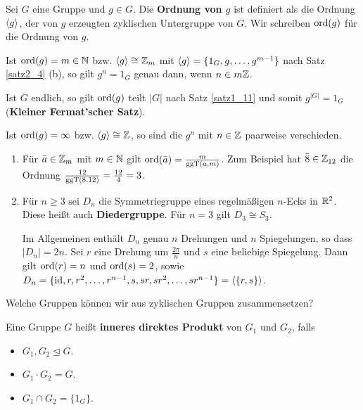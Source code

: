 \begin{definition}
	Sei $G$ eine Gruppe und $g \in G$. Die \textbf{Ordnung von $g$} ist definiert als die Ordnung $\langle g \rangle$, der von $g$ erzeugten zyklischen Untergruppe von $G$.
	Wir schreiben $\mathrm{ord}(g)$ für die Ordnung von $g$. 
\end{definition}
\begin{rem}
	Ist $\mathrm{ord}(g) = m \in \mathbb{N}$ bzw. $\langle g \rangle \cong \mathbb{Z}_m$ mit $\langle g \rangle = \{1_G, g, \dots, g^{m-1}\}$ nach Satz \ref{satz2_4} (b), so gilt $g^n = 1_G$ genau dann, wenn $n \in m\mathbb{Z}$. 
	
	Ist $G$ endlich, so gilt $\mathrm{ord}(g)$ teilt $|G|$ nach Satz \ref{satz1_11} und somit $g^{|G|} = 1_G$ (\textbf{Kleiner Fermat'scher Satz}).
	
	Ist $\mathrm{ord}(g) = \infty$ bzw. $\langle g \rangle \cong \mathbb{Z}$, so sind die $g^n$ mit $n \in \mathbb{Z}$ paarweise verschieden.
\end{rem}
\begin{beispiel}
	\begin{enumerate}[label=(\arabic*)]
		\item Für $\bar{a} \in \mathbb{Z}_m$ mit $m \in \mathbb{N}$ gilt $\mathrm{ord}(\bar{a}) = \frac{m}{\mathrm{ggT}(a,m)}$. Zum Beispiel hat $\bar{8} \in \mathbb{Z}_{12}$ die Ordnung $\frac{12}{\mathrm{ggT}(8,12)} = \frac{12}{4} = 3$.
		
		\item Für $n \geq 3$ sei $D_n$ die Symmetriegruppe eines regelmäßigen $n$-Ecks in $\mathbb{R}^2$. Diese heißt auch \textbf{Diedergruppe}. Für $n = 3$ gilt $D_3 \cong S_3$.
		
		Im Allgemeinen enthält $D_n$ genau $n$ Drehungen und $n$ Spiegelungen, so dass $|D_n| = 2n$. Sei $r$ eine Drehung um $\frac{2\pi}{n}$ und $s$ eine beliebige Spiegelung. Dann gilt $\mathrm{ord}(r) = n$ und $\mathrm{ord}(s) = 2$, sowie $D_n = \{\mathrm{id}, r, r^2, \dots, r^{n-1}, s, sr, sr^2, \dots, sr^{n-1}\} = \langle \{r,s\} \rangle$.
	\end{enumerate}
\end{beispiel}

\begin{leftbar}
	Welche Gruppen können wir aus zyklischen Gruppen zusammensetzen?
\end{leftbar}

\begin{definition}
	Eine Gruppe $G$ heißt \textbf{inneres direktes Produkt} von $G_1$ und $G_2$, falls
	\begin{itemize}
		\item $G_1, G_2 \unlhd G$.
		\item $G_1 \cdot G_2 = G$.
		\item $G_1 \cap G_2 = \{1_G\}$.
	\end{itemize}
\end{definition}

